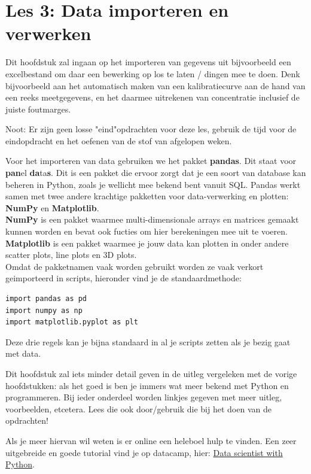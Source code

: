 \chapter{Les 3: Data importeren en verwerken}

Dit hoofdstuk zal ingaan op het importeren van gegevens uit bijvoorbeeld een excelbestand om daar een bewerking op los te laten / dingen mee te doen. Denk bijvoorbeeld aan het automatisch maken van een kalibratiecurve aan de hand van een reeks meetgegevens, en het daarmee uitrekenen van concentratie inclusief de juiste foutmarges.

Noot: Er zijn geen losse "eind"opdrachten voor deze les, gebruik de tijd voor de eindopdracht en het oefenen van de stof van afgelopen weken. 

Voor het importeren van data gebruiken we het pakket \textbf{pandas}. Dit staat voor \textbf{pan}el \textbf{da}ta\textbf{s}. Dit is een pakket die ervoor zorgt dat je een soort van database kan beheren in Python, zoals je wellicht mee bekend bent vanuit SQL. Pandas werkt samen met twee andere krachtige pakketten voor data-verwerking en plotten: \textbf{NumPy} en \textbf{Matplotlib}.\\ \textbf{NumPy} is een pakket waarmee multi-dimensionale arrays en matrices gemaakt kunnen worden en bevat ook fucties om hier berekeningen mee uit te voeren. \\
\textbf{Matplotlib} is een pakket waarmee je jouw data kan plotten in onder andere scatter plots, line plots en 3D plots.
\\ Omdat de pakketnamen vaak worden gebruikt worden ze vaak verkort geimporteerd in scripts, hieronder vind je de standaardmethode:
\begin{lstlisting}[frame=single]
import pandas as pd
import numpy as np
import matplotlib.pyplot as plt
\end{lstlisting}

Deze drie regels kan je bijna standaard in al je scripts zetten als je bezig gaat met data.

Dit hoofdstuk zal iets minder detail geven in de uitleg vergeleken met de vorige hoofdstukken: als het goed is ben je immers wat meer bekend met Python en programmeren. Bij ieder onderdeel worden linkjes gegeven met meer uitleg, voorbeelden, etcetera. Lees die ook door/gebruik die bij het doen van de opdrachten!

Als je meer hiervan wil weten is er online een heleboel hulp te vinden. Een zeer uitgebreide en goede tutorial vind je op datacamp, hier: \href{https://www.datacamp.com/tracks/data-scientist-with-python}{Data scientist with Python}.

